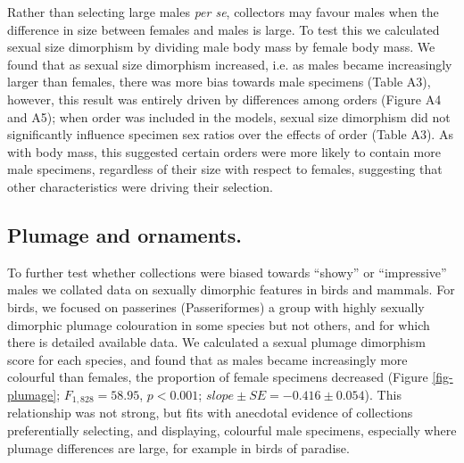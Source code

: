 \documentclass[a4paper, 12pt]{article}
\begin{document}
Rather than selecting large males \textit{per se}, collectors may favour males when the difference in size between females and males is large. 
To test this we calculated sexual size dimorphism by dividing male body mass by female body mass. 
We found that as sexual size dimorphism increased, i.e. as males became increasingly larger than females, there was more bias towards male specimens (Table A3), however, this result was entirely driven by differences among orders (Figure A4 and A5); when order was included in the models, sexual size dimorphism did not significantly influence specimen sex ratios over the effects of order (Table A3). 
As with body mass, this suggested certain orders were more likely to contain more male specimens, regardless of their size with respect to females, suggesting that other characteristics were driving their selection.

\subsection{Plumage and ornaments.} 
To further test whether collections were biased towards ``showy'' or ``impressive'' males we collated data on sexually dimorphic features in birds and mammals. 
For birds, we focused on passerines (Passeriformes) a group with highly sexually dimorphic plumage colouration in some species but not others, and for which there is detailed available data\cite{dale2015data,dale2015effects}. 
We calculated a sexual plumage dimorphism score for each species, and found that as males became increasingly more colourful than females, the proportion of female specimens decreased (Figure \ref{fig-plumage}; $F_{1, 828} = 58.95$, $p < 0.001$; $slope \pm SE = -0.416 \pm 0.054$). 
This relationship was not strong, but fits with anecdotal evidence of collections preferentially selecting, and displaying\cite{machin2008}, colourful male specimens, especially where plumage differences are large, for example in birds of paradise. 
\end{document}
